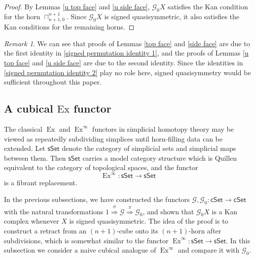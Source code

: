 \documentclass[oneside, 12pt]{amsart}
\numberwithin{equation}{section}
\theoremstyle{plain}
\newtheorem{proposition}[theorem]{Proposition}
\theoremstyle{definition}
\theoremstyle{remark}
\newtheorem{remark}[theorem]{Remark}
\newcommand{\cSet}{\mathsf{cSet}}
\newcommand{\ex}{\operatorname{Ex}}
\begin{document}
	\begin{proof}
		By Lemmas \ref{u top face} and \ref{u side face}, $\mathcal{G}_0X$ satisfies the Kan condition for the horn $\sqcap_{n+1,0}^{n+1}$. Since $\mathcal{G}_0X$ is signed quasisymmetric, it also satisfies the Kan conditions for the remaining horns.
	\end{proof}
	\begin{remark}
		\label{quasisymm vs symm}
		We can see that proofs of Lemmas \ref{top face} and \ref{side face} are due to the first identity in \eqref{signed permutation identity 1}, and the proofs of Lemmas \ref{u top face} and \ref{u side face} are due to the second identity. Since the identities in \eqref{signed permutation identity 2} play no role here, signed quasisymmetry would be sufficient throughout this paper.
	\end{remark}
	
	\subsection{A cubical \texorpdfstring{$\mathrm{Ex}$}{Ex} functor}
	The classical $\ex$ and $\ex^\infty$ functors in simplicial homotopy theory \cite{K} may be viewed as repeatedly subdividing simplices until horn-filling data can be extended. Let $\mathsf{sSet}$ denote the category of simplicial sets and simplicial maps between them. Then $\mathsf{sSet}$ carries a model category structure which is Quillen equivalent to the category of topological spaces, and the functor 
	\[
	\ex^\infty:\mathsf{sSet}\to\mathsf{sSet}
	\]
	is a fibrant replacement.%
		
		
		
		
		
		
		
		
		
		
		
		
	In the previous subsections, we have constructed the functors $\mathcal{G},\mathcal{G}_0\colon\cSet\to\cSet$ with the natural transformations $1\overset{\phi}{\Rightarrow}\mathcal{G}\overset{\pi}{\Rightarrow}\mathcal{G}_0$, and shown that $\mathcal{G}_0X$ is a Kan complex whenever $X$ is signed quasisymmetric. The idea of the proof is to construct a retract from an $(n+1)$-cube onto its $(n+1)$-horn after subdivisions, which is somewhat similar to the functor $\ex^\infty\colon\mathsf{sSet}\to\mathsf{sSet}$. In this subsection we consider a naive cubical analogue of $\ex^\infty$ and compare it with $\mathcal{G}_0$.
	
\end{document}
